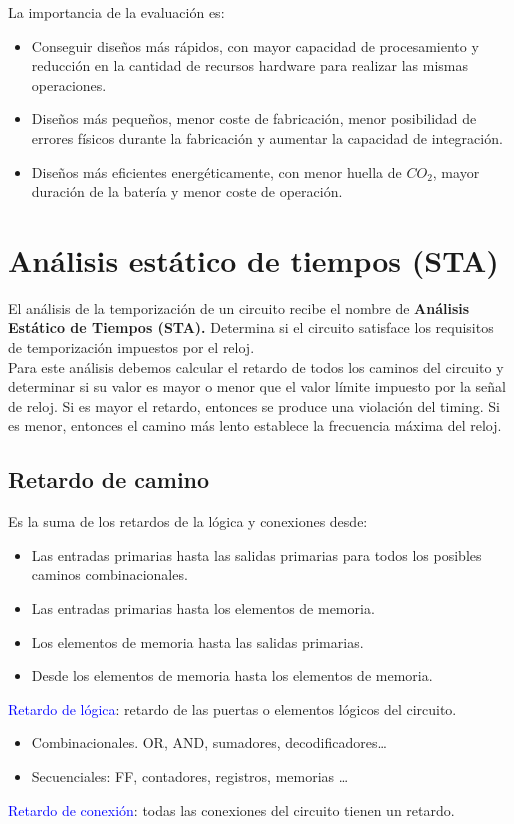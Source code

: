 La importancia de la evaluación es:
\begin{itemize}
    \item Conseguir diseños más rápidos, con mayor capacidad de procesamiento y reducción en la cantidad de recursos hardware para realizar las mismas operaciones.
    \item Diseños más pequeños, menor coste de fabricación, menor posibilidad de errores físicos durante la fabricación y aumentar la capacidad de integración.
    \item Diseños más eficientes energéticamente, con menor huella de $CO_{2}$, mayor duración de la batería y menor coste de operación.
\end{itemize}

\section{Análisis estático de tiempos (STA)}
El análisis de la temporización de un circuito recibe el nombre de \textbf{Análisis Estático de Tiempos (STA).} Determina si el circuito satisface los requisitos de temporización impuestos por el reloj.
\\ Para este análisis debemos calcular el retardo de todos los caminos del circuito y determinar si su valor es mayor o menor que el valor límite impuesto por la señal de reloj. Si es mayor el retardo, entonces se produce una violación del timing. Si es menor, entonces el camino más lento establece la frecuencia máxima del reloj.

\subsection{Retardo de camino}
Es la suma de los retardos de la lógica y conexiones desde:
\begin{itemize}
    \item Las entradas primarias hasta las salidas primarias para todos los posibles caminos combinacionales.
    \item Las entradas primarias hasta los elementos de memoria.
    \item Los elementos de memoria hasta las salidas primarias.
    \item Desde los elementos de memoria hasta los elementos de memoria.
\end{itemize}
\textcolor{blue}{Retardo de lógica}: retardo de las puertas o elementos lógicos del circuito.
\begin{itemize}
    \item Combinacionales. OR, AND, sumadores, decodificadores\dots
    \item Secuenciales: FF, contadores, registros, memorias \dots
\end{itemize}
\textcolor{blue}{Retardo de conexión}: todas las conexiones del circuito tienen un retardo.

